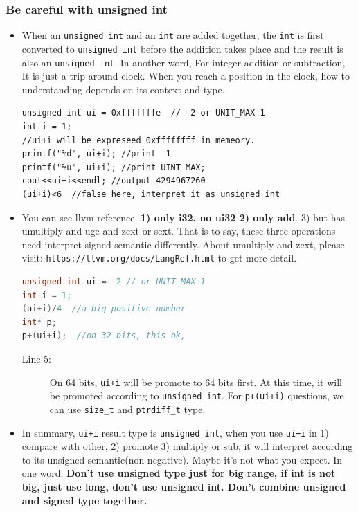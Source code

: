 \documentclass[a4paper,11pt,twoside]{book}
\begin{document}
\subsubsection{Be careful with unsigned int}
\begin{itemize}

    \item When an \texttt{unsigned int} and an \texttt{int} are added together, the \texttt{int} is first converted to \texttt{unsigned int} before the addition takes place and the result is also an \texttt{unsigned int}. In another word, For integer addition or subtraction, It is just a trip around clock. When you reach a position in the clock, how to understanding depends on its context and type.
\begin{lstlisting}[numbers=none]
unsigned int ui = 0xfffffffe  // -2 or UNIT_MAX-1
int i = 1;
//ui+i will be expreseed 0xffffffff in memeory. 
printf("%d", ui+i); //print -1
printf("%u", ui+i); //print UINT_MAX;	
cout<<ui+i<<endl; //output 4294967260
(ui+i)<6  //false here, interpret it as unsigned int
\end{lstlisting}
    
	\item You can see llvm reference. \textbf{1) only i32, no ui32 2) only add}.  3) but has umultiply and uge and zext or sext. That is to say, these three operations need interpret signed semantic differently.  About umultiply and zext, please visit: \verb|https://llvm.org/docs/LangRef.html| to get more detail.
	 
\begin{lstlisting}[frame=single, language=c++]
unsigned int ui = -2 // or UNIT_MAX-1
int i = 1;
(ui+i)/4  //a big positive number
int* p;
p+(ui+i);  //on 32 bits, this ok, 
\end{lstlisting}

\begin{description}
	\item[Line 5:] On 64 bits, \texttt{ui+i} will be promote to 64 bits first. At this time, it will be promoted according to \texttt{unsigned int}. For \texttt{p+(ui+i)} questions, we can use \texttt{size\_t} and \texttt{ptrdiff\_t} type. 
\end{description}
	
    \item In summary, \texttt{ui+i} result type is \texttt{unsigned int},  when you use \texttt{ui+i} in 1) compare with other, 2) promote 3) multiply or sub, it will interpret according to its unsigned semantic(non negative). Maybe it's not what you expect.  In one word, \textbf{Don't use unsigned type just for big range, if int is not big, just use long, don't use unsigned int. Don't combine unsigned and signed type together.}	
\end{itemize}
\end{document}
